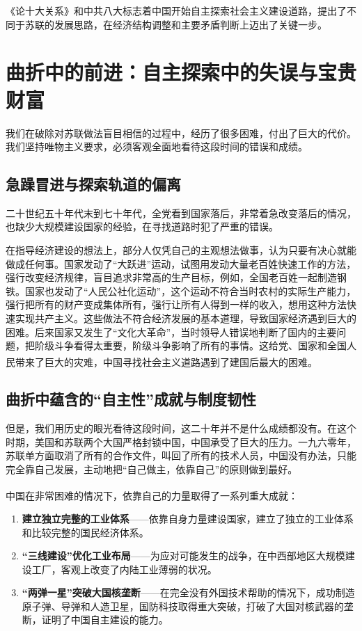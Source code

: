 \documentclass[12pt, a4paper]{ctexart}
\newcommand{\upcite}[1]{\textsuperscript{\cite{#1}}}
\numberwithin{table}{section}
\numberwithin{figure}{section}
\begin{document}
\begin{summarybox}
《论十大关系》和中共八大标志着中国开始自主探索社会主义建设道路，提出了不同于苏联的发展思路，在经济结构调整和主要矛盾判断上迈出了关键一步。
\end{summarybox}

\section{曲折中的前进：自主探索中的失误与宝贵财富}
我们在破除对苏联做法盲目相信的过程中，经历了很多困难，付出了巨大的代价。我们坚持唯物主义要求，必须客观全面地看待这段时间的错误和成绩。

\subsection{急躁冒进与探索轨道的偏离}
二十世纪五十年代末到七十年代，全党看到国家落后，非常着急改变落后的情况，也缺少大规模建设国家的经验，在寻找道路时犯了严重的错误。

在指导经济建设的想法上，部分人仅凭自己的主观想法做事，认为只要有决心就能做成任何事。国家发动了“大跃进”运动，试图用发动大量老百姓快速工作的方法，强行改变经济规律，盲目追求非常高的生产目标，例如，全国老百姓一起制造钢铁。国家也发动了“人民公社化运动”，这个运动不符合当时农村的实际生产能力，强行把所有的财产变成集体所有，强行让所有人得到一样的收入，想用这种方法快速实现共产主义。这些做法不符合经济发展的基本道理，导致国家经济遇到巨大的困难。后来国家又发生了“文化大革命”，当时领导人错误地判断了国内的主要问题，把阶级斗争看得太重要，阶级斗争影响了所有的事情。这给党、国家和全国人民带来了巨大的灾难，中国寻找社会主义道路遇到了建国后最大的困难\upcite{ref9}。

\subsection{曲折中蕴含的“自主性”成就与制度韧性}
但是，我们用历史的眼光看待这段时间，这二十年并不是什么成绩都没有。在这个时期，美国和苏联两个大国严格封锁中国，中国承受了巨大的压力。一九六零年，苏联单方面取消了所有的合作文件，叫回了所有的技术人员，中国没有办法，只能完全靠自己发展，主动地把“自己做主，依靠自己”的原则做到最好。

中国在非常困难的情况下，依靠自己的力量取得了一系列重大成就\upcite{ref10}：

\begin{enumerate}[leftmargin=2em, itemsep=0.3em, label=\textbf{\arabic*.}]
  \item \textbf{建立独立完整的工业体系}——依靠自身力量建设国家，建立了独立的工业体系和比较完整的国民经济体系。
  \item \textbf{“三线建设”优化工业布局}——为应对可能发生的战争，在中西部地区大规模建设工厂，客观上改变了内陆工业薄弱的状况。
  \item \textbf{“两弹一星”突破大国核垄断}——在完全没有外国技术帮助的情况下，成功制造原子弹、导弹和人造卫星，国防科技取得重大突破，打破了大国对核武器的垄断，证明了中国自主建设的能力。
\end{enumerate}
\end{document}

